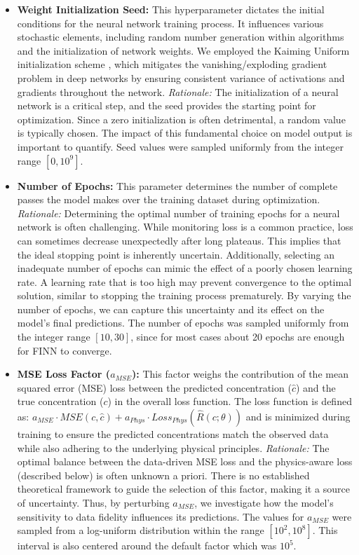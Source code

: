 \begin{itemize}
    \item \textbf{Weight Initialization Seed:} This hyperparameter dictates the initial conditions for the neural network training process. It influences various stochastic elements, including random number generation within algorithms and the initialization of network weights. We employed the Kaiming Uniform initialization scheme \cite{he2015delving}, which mitigates the vanishing/exploding gradient problem in deep networks by ensuring consistent variance of activations and gradients throughout the network. \textit{Rationale:} The initialization of a neural network is a critical step, and the seed provides the starting point for optimization. Since a zero initialization is often detrimental, a random value is typically chosen. The impact of this fundamental choice on model output is important to quantify. Seed values were sampled uniformly from the integer range $[0, 10^9]$.
    \item \textbf{Number of Epochs:} This parameter determines the number of complete passes the model makes over the training dataset during optimization. \textit{Rationale:} Determining the optimal number of training epochs for a neural network is often challenging. While monitoring loss is a common practice, loss can sometimes decrease unexpectedly after long plateaus. This implies that the ideal stopping point is inherently uncertain. Additionally, selecting an inadequate number of epochs can mimic the effect of a poorly chosen learning rate. A learning rate that is too high may prevent convergence to the optimal solution, similar to stopping the training process prematurely. By varying the number of epochs, we can capture this uncertainty and its effect on the model's final predictions. The number of epochs was sampled uniformly from the integer range $[10, 30]$, since for most cases about 20 epochs are enough for FINN to converge.
    \item \textbf{MSE Loss Factor ($a_{MSE}$):} This factor weighs the contribution of the mean squared error (MSE) loss between the predicted concentration ($\hat{c}$) and the true concentration ($c$) in the overall loss function. The loss function is defined as: $a_{MSE} \cdot MSE(c, \hat{c}) + a_{Phys} \cdot Loss_{Phys}(\hat{R}(c;\theta))$ and is minimized during training to ensure the predicted concentrations match the observed data while also adhering to the underlying physical principles. \textit{Rationale:} The optimal balance between the data-driven MSE loss and the physics-aware loss (described below) is often unknown a priori. There is no established theoretical framework to guide the selection of this factor, making it a source of uncertainty. Thus, by perturbing $a_{MSE}$, we investigate how the model's sensitivity to data fidelity influences its predictions. The values for $a_{MSE}$ were sampled from a log-uniform distribution within the range $[10^2, 10^8]$. This interval is also centered around the default factor which was $10^5$.

\end{itemize}
